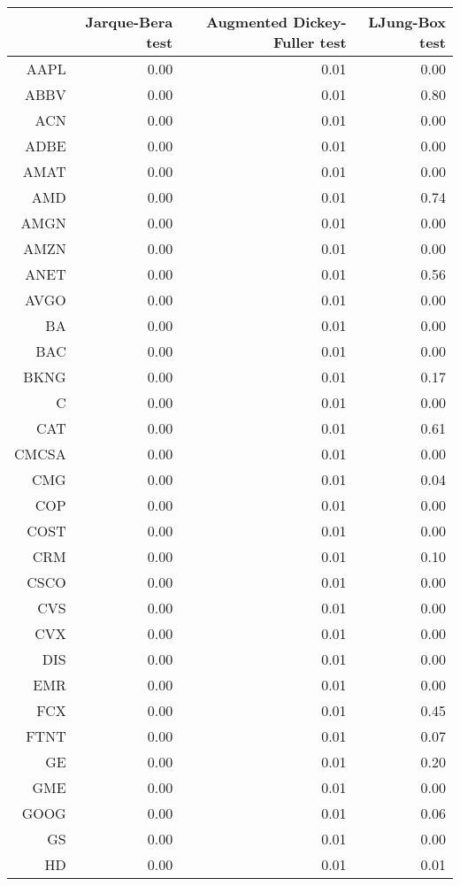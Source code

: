 \begin{table}[ht]
\centering
\begin{tabular}{rrrr}
  \hline
 & Jarque-Bera test & Augmented Dickey-Fuller test & LJung-Box test \\ 
  \hline
AAPL & 0.00 & 0.01 & 0.00 \\ 
  ABBV & 0.00 & 0.01 & 0.80 \\ 
  ACN & 0.00 & 0.01 & 0.00 \\ 
  ADBE & 0.00 & 0.01 & 0.00 \\ 
  AMAT & 0.00 & 0.01 & 0.00 \\ 
  AMD & 0.00 & 0.01 & 0.74 \\ 
  AMGN & 0.00 & 0.01 & 0.00 \\ 
  AMZN & 0.00 & 0.01 & 0.00 \\ 
  ANET & 0.00 & 0.01 & 0.56 \\ 
  AVGO & 0.00 & 0.01 & 0.00 \\ 
  BA & 0.00 & 0.01 & 0.00 \\ 
  BAC & 0.00 & 0.01 & 0.00 \\ 
  BKNG & 0.00 & 0.01 & 0.17 \\ 
  C & 0.00 & 0.01 & 0.00 \\ 
  CAT & 0.00 & 0.01 & 0.61 \\ 
  CMCSA & 0.00 & 0.01 & 0.00 \\ 
  CMG & 0.00 & 0.01 & 0.04 \\ 
  COP & 0.00 & 0.01 & 0.00 \\ 
  COST & 0.00 & 0.01 & 0.00 \\ 
  CRM & 0.00 & 0.01 & 0.10 \\ 
  CSCO & 0.00 & 0.01 & 0.00 \\ 
  CVS & 0.00 & 0.01 & 0.00 \\ 
  CVX & 0.00 & 0.01 & 0.00 \\ 
  DIS & 0.00 & 0.01 & 0.00 \\ 
  EMR & 0.00 & 0.01 & 0.00 \\ 
  FCX & 0.00 & 0.01 & 0.45 \\ 
  FTNT & 0.00 & 0.01 & 0.07 \\ 
  GE & 0.00 & 0.01 & 0.20 \\ 
  GME & 0.00 & 0.01 & 0.00 \\ 
  GOOG & 0.00 & 0.01 & 0.06 \\ 
  GS & 0.00 & 0.01 & 0.00 \\ 
  HD & 0.00 & 0.01 & 0.01 \\ 

\end{tabular}
\end{table}
